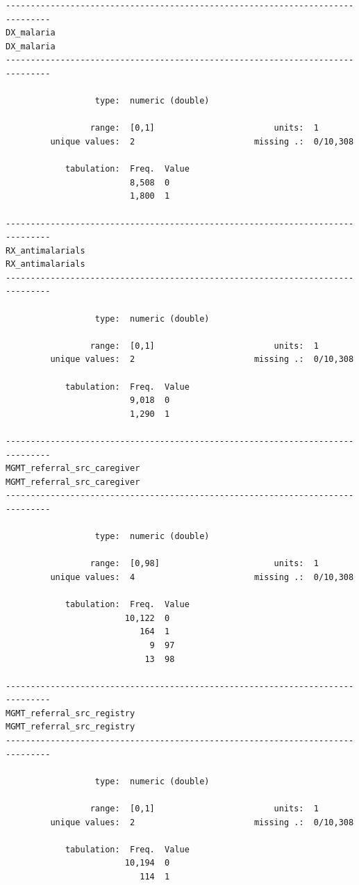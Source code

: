 \documentclass[
  letterpaper,
  DIV=11,
  numbers=noendperiod,
  oneside]{scrreprt}
\begin{document}
\begin{verbatim}
-------------------------------------------------------------------------------
DX_malaria                                                           DX_malaria
-------------------------------------------------------------------------------

                  type:  numeric (double)

                 range:  [0,1]                        units:  1
         unique values:  2                        missing .:  0/10,308

            tabulation:  Freq.  Value
                         8,508  0
                         1,800  1

-------------------------------------------------------------------------------
RX_antimalarials                                               RX_antimalarials
-------------------------------------------------------------------------------

                  type:  numeric (double)

                 range:  [0,1]                        units:  1
         unique values:  2                        missing .:  0/10,308

            tabulation:  Freq.  Value
                         9,018  0
                         1,290  1

-------------------------------------------------------------------------------
MGMT_referral_src_caregiver                         MGMT_referral_src_caregiver
-------------------------------------------------------------------------------

                  type:  numeric (double)

                 range:  [0,98]                       units:  1
         unique values:  4                        missing .:  0/10,308

            tabulation:  Freq.  Value
                        10,122  0
                           164  1
                             9  97
                            13  98

-------------------------------------------------------------------------------
MGMT_referral_src_registry                           MGMT_referral_src_registry
-------------------------------------------------------------------------------

                  type:  numeric (double)

                 range:  [0,1]                        units:  1
         unique values:  2                        missing .:  0/10,308

            tabulation:  Freq.  Value
                        10,194  0
                           114  1
\end{verbatim}
\end{document}
